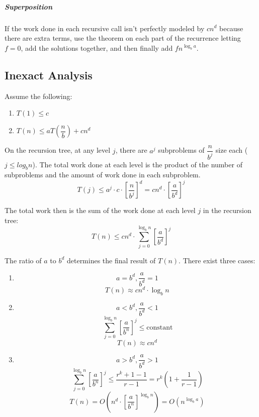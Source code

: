 \documentclass[11pt]{article}
\begin{document}
		\subparagraph{Superposition} If the work done in each recursive call isn't perfectly modeled by $cn^d$ because there are extra terms, use the theorem on each part of the recurrence letting $f=0$, add the solutions together, and then finally add $fn^{\log_b a}$.
		
	\subsection{Inexact Analysis}
		Assume the following:
		\begin{enumerate}
			\item $T(1)\leq c$
			\item $T(n)\leq aT\left(\dfrac{n}{b}\right) + cn^d$
		\end{enumerate}
		
		On the recursion tree, at any level $j$, there are $a^j$ subproblems of $\dfrac{n}{b^j}$ size each ($j\leq log_b n$). The total work done at each level is the product of the number of subproblems and the amount of work done in each subproblem.
		\begin{equation}
			T(j)\leq a^j\cdot c\cdot\left[\frac{n}{b^j}\right]^d = cn^d\cdot\left[\frac{a}{b^d}\right]^j
		\end{equation}
		
		The total work then is the sum of the work done at each level $j$ in the recursion tree:
		\begin{equation}
			T(n)\leq cn^d\cdot \sum_{j=0}^{\log_b n}\left[\frac{a}{b^d}\right]^j
		\end{equation}
		
		The ratio of $a$ to $b^d$ determines the final result of $T(n)$. There exist three cases:
		
		\begin{enumerate}
			\item
				\[a=b^d, \frac{a}{b^d} = 1\]
				\begin{equation}
					T(n) \approx cn^d\cdot\log_b n
				\end{equation}
			\item
				\[a<b^d, \frac{a}{b^d}<1\]
				\[\sum_{j=0}^{\log_b n}\left[\frac{a}{b^n}\right]^j \leq \text{constant}\]
				\begin{equation}
					T(n) \approx cn^d
				\end{equation}
			\item
				\[a>b^d, \frac{a}{b^d} > 1\]
				\[\sum_{j=0}^{\log_b n}\left[\frac{a}{b^n}\right]^j \leq \frac{r^k+1 -1}{r-1} = r^k\left(1 + \frac{1}{r-1}\right)\]
				\begin{equation}
					T(n)=O\left(n^d\cdot\left[\frac{a}{b^n}\right]^{\log_b n}\right) = O(n^{\log_b a})
				\end{equation}
		\end{enumerate}
\end{document}
